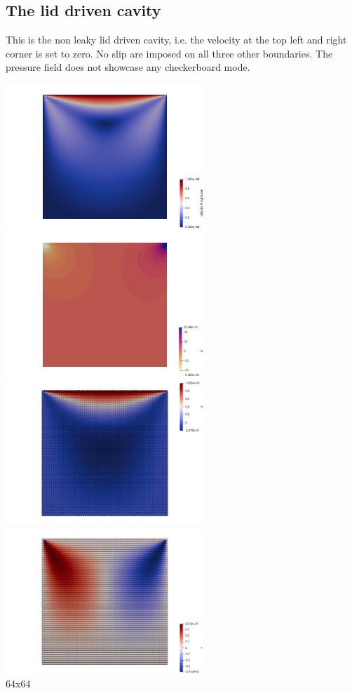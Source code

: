 \subsection*{The lid driven cavity}

This is the non leaky lid driven cavity, i.e. the velocity at the top left and right corner 
is set to zero. No slip are imposed on all three other boundaries. 
The pressure field does not showcase any checkerboard mode. 

\begin{center}
\includegraphics[width=7.5cm]{python_codes/fieldstone_80/results/ldc/vel}
\includegraphics[width=7.5cm]{python_codes/fieldstone_80/results/ldc/p}
\includegraphics[width=7.5cm]{python_codes/fieldstone_80/results/ldc/u_dofs}
\includegraphics[width=7.5cm]{python_codes/fieldstone_80/results/ldc/v_dofs}\\
{\captionfont 64x64}
\end{center}

